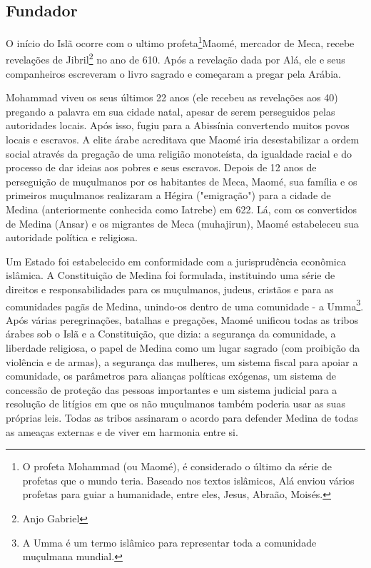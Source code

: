 \documentclass[12pt]{article}
\begin{document}
\subsection{Fundador}
O início do Islã ocorre com o ultimo profeta\footnote{
    O profeta Mohammad (ou Maomé), é considerado o último da série de profetas que o mundo teria.
    Baseado nos textos islâmicos, Alá enviou vários profetas para guiar a humanidade, entre eles, Jesus, Abraão, Moisés.
}Maomé, mercador de Meca, recebe revelações de Jibril\footnote{Anjo Gabriel} no ano de 610.
Após a revelação dada por Alá, ele e seus companheiros escreveram o livro sagrado e começaram a pregar pela Arábia.
\par Mohammad viveu os seus últimos 22 anos (ele recebeu as revelações aos 40) pregando a palavra em sua cidade natal, apesar de serem perseguidos pelas autoridades locais.
Após isso, fugiu para a Abissínia convertendo muitos povos locais e escravos.
A elite árabe acreditava que Maomé iria desestabilizar a ordem social através da pregação de uma religião monoteísta, da igualdade racial e do processo de dar ideias aos pobres e seus escravos. 
Depois de 12 anos de perseguição de muçulmanos por os habitantes de Meca, Maomé, sua família e os primeiros muçulmanos realizaram a Hégira ("emigração") para a cidade de Medina (anteriormente conhecida como Iatrebe) em 622.
Lá, com os convertidos de Medina (Ansar) e os migrantes de Meca (muhajirun), Maomé estabeleceu sua autoridade política e religiosa.
\par Um Estado foi estabelecido em conformidade com a jurisprudência econômica islâmica.
A Constituição de Medina foi formulada, instituindo uma série de direitos e responsabilidades para os muçulmanos, judeus, cristãos e para as comunidades pagãs de Medina, unindo-os dentro de uma comunidade - a Umma\footnote{A Umma é um termo islâmico para representar toda a comunidade muçulmana mundial.}.
Após várias peregrinações, batalhas e pregações, Maomé unificou todas as tribos árabes sob o Islã e a Constituição, que dizia:
a segurança da comunidade, a liberdade religiosa, o papel de Medina como um lugar sagrado (com proibição da violência e de armas), a segurança das mulheres, um sistema fiscal para apoiar a comunidade, os parâmetros para alianças políticas exógenas, um sistema de concessão de proteção das pessoas importantes e um sistema judicial para a resolução de litígios em que os não muçulmanos também poderia usar as suas próprias leis. Todas as tribos assinaram o acordo para defender Medina de todas as ameaças externas e de viver em harmonia entre si.
\end{document}
